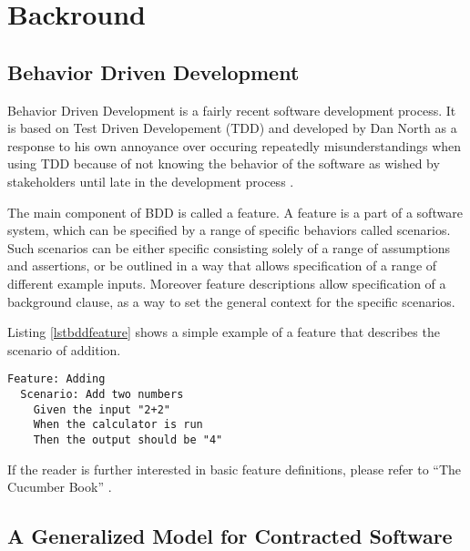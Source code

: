 \section{Backround}

\subsection{Behavior Driven Development}
\label{sub:bdd}
Behavior Driven Development is a fairly recent software development process. It is based on Test Driven Developement (TDD) and developed by Dan North as a response to his own annoyance over occuring repeatedly misunderstandings when using TDD because of not knowing the behavior of the software as wished by stakeholders until late in the development process \cite{north2006}.

The main component of BDD is called a feature. 
A feature is a part of a software system,
which can be specified by a range of specific behaviors called scenarios.
Such scenarios can be either specific consisting solely of a range of
assumptions and assertions, or be outlined in a way that allows
specification of a range of different example inputs.
Moreover feature descriptions allow specification of a background clause,
as a way to set the general context for the specific scenarios.

Listing \ref{lstbddfeature} shows a simple example of a feature that describes the scenario of addition. 


\begin{lstlisting}[caption={Sample Addition Feature},label={lst:bddfeature}]
Feature: Adding
  Scenario: Add two numbers
    Given the input "2+2"
    When the calculator is run 
    Then the output should be "4"
\end{lstlisting}

If the reader is further interested in basic feature definitions,
please refer to “The Cucumber Book” \cite{hellesoy2012}.

\subsection{A Generalized Model for Contracted Software}
\label{sub:AGeneralizedModelforContractedSoftware}


